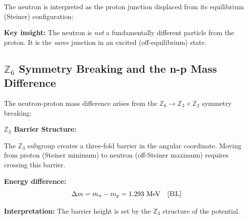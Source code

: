 \documentclass[11pt,a4paper]{article}
\newcommand{\tagBL}{\textcolor{gray!70!black}{\textbf{[BL]}}}
\begin{document}
The neutron is interpreted as the proton junction displaced from its equilibrium (Steiner) configuration:

\begin{center}
\end{center}

\textbf{Key insight:} The neutron is \emph{not} a fundamentally different particle from the proton. It is the \emph{same} junction in an excited (off-equilibrium) state.

\subsection{$\mathbb{Z}_6$ Symmetry Breaking and the n-p Mass Difference}

The neutron-proton mass difference arises from the $\mathbb{Z}_6 \to \mathbb{Z}_3 \times \mathbb{Z}_2$ symmetry breaking:

\begin{derivbox}
\textbf{$\mathbb{Z}_3$ Barrier Structure:}

The $\mathbb{Z}_3$ subgroup creates a three-fold barrier in the angular coordinate. Moving from proton (Steiner minimum) to neutron (off-Steiner maximum) requires crossing this barrier.

\textbf{Energy difference:}
\begin{equation}
    \Delta m = m_n - m_p = 1.293 \text{ MeV} \quad \tagBL{}
\end{equation}

\textbf{Interpretation:} The barrier height is set by the $\mathbb{Z}_3$ structure of the potential.
\end{derivbox}
\end{document}
